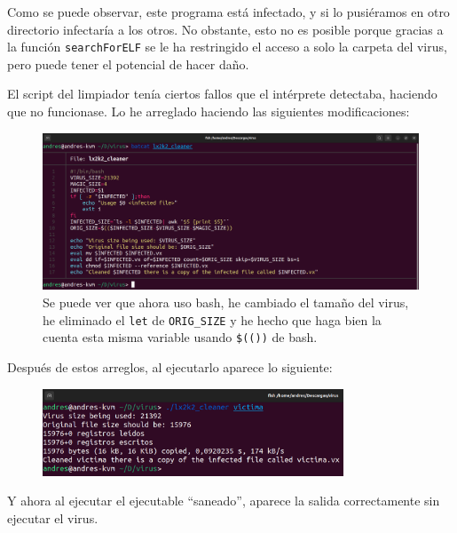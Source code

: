 \documentclass{article}
\begin{document}
Como se puede observar, este programa está infectado, y si lo pusiéramos en otro directorio infectaría a los otros. No obstante, esto no es posible porque gracias a la función \verb|searchForELF| se le ha restringido el acceso a solo la carpeta del virus, pero puede tener el potencial de hacer daño.

\bigskip

El script del limpiador tenía ciertos fallos que el intérprete detectaba, haciendo que no funcionase. Lo he arreglado haciendo las siguientes modificaciones: 

\begin{figure}[H]
    \includegraphics[width=\textwidth]{imagenes/Captura desde 2022-11-23 12-44-29.png}
    \caption{Se puede ver que ahora uso bash, he cambiado el tamaño del virus, he eliminado el \texttt{let} de \texttt{ORIG\_SIZE} y he hecho que haga bien la cuenta esta misma variable usando \texttt{\$(())} de bash.}
\end{figure}

\newpage

Después de estos arreglos, al ejecutarlo aparece lo siguiente:

\begin{figure}[H]
    \centering
    \includegraphics[width=0.8\textwidth]{imagenes/Captura desde 2022-11-23 12-45-50.png}
\end{figure}

\bigskip

Y ahora al ejecutar el ejecutable ``saneado'', aparece la salida correctamente sin ejecutar el virus.

\bigskip
\end{document}

